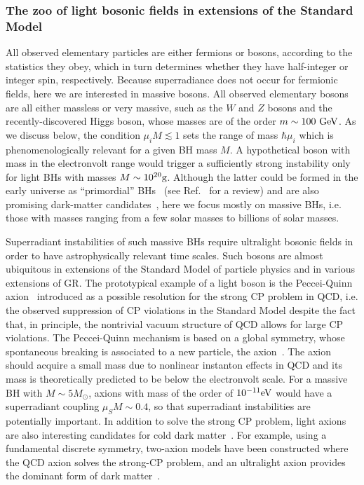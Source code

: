 \documentclass[11pt]{article}
\numberwithin{equation}{section} %
\begin{document}
\subsubsection{The zoo of light bosonic fields in extensions of the Standard Model}\label{sec:ultralight_motivations}
All observed elementary particles are either fermions or bosons, according to the statistics they obey, which in turn determines whether they have half-integer or integer spin, respectively. Because superradiance does not occur for fermionic fields, here we are interested in massive bosons. 
All observed elementary bosons are all either massless or very massive, such as the $W$ and $Z$ bosons and the 
recently-discovered Higgs boson, whose masses are of the order $m\sim 100~{\rm GeV}$. As we discuss below, the condition 
$\mu_i M\lesssim1$ sets the range of mass $\hbar\mu_i$ which is phenomenologically relevant for a given BH mass $M$. A 
hypothetical boson with mass in the electronvolt range would trigger a sufficiently strong instability only for light 
BHs with masses $M\sim 10^{20}{\rm g}$. Although the latter could be formed in the early universe as ``primordial'' 
BHs~\cite{1971MNRAS.152...75H,1966AZh....43..758Z,1974MNRAS.168..399C} (see Ref.~\cite{Carr:2009jm} for 
a review) and are also promising dark-matter candidates~\cite{Carr:2016drx}, here we focus mostly on massive BHs, i.e. 
those with masses ranging from a few solar masses to billions of solar masses.

Superradiant instabilities of such massive BHs require ultralight bosonic fields in order to have astrophysically relevant time scales.
Such bosons are almost ubiquitous in extensions of the Standard Model of particle physics and in various extensions of GR.
%
The prototypical example of a light boson is the Peccei-Quinn axion~\cite{PecceiQuinn} introduced as a possible resolution for the strong CP problem in QCD, i.e. the observed suppression of CP violations in the Standard Model despite the fact that, in principle, the nontrivial vacuum structure of QCD allows for large CP violations. The Peccei-Quinn mechanism is based on a global symmetry, whose spontaneous breaking is associated to a new particle, the axion~\cite{1978PhRvL..40..223W,Wilczek:1977pj}. The axion should acquire a small mass due to nonlinear instanton effects in QCD and its mass is theoretically predicted to be below the electronvolt scale. 
For a massive BH with $M\sim 5 M_\odot$, axions with mass of the order of $10^{-11}{\rm eV}$ would have a superradiant 
coupling $\mu_S M\sim 0.4$, so that superradiant instabilities are potentially important. In addition to solve the 
strong CP problem, light axions are also interesting candidates for cold dark 
matter~\cite{Fairbairn:2014zta,Marsh:2014qoa,Marsh:2015xka,Bertone:2019irm,Braaten:2019knj,OHare:2020wah}. For example, using a fundamental discrete symmetry, two-axion models have been constructed where the QCD axion solves the strong-CP problem, and an ultralight axion provides the dominant form of dark matter~\cite{Kim:2015yna}.
\end{document}
